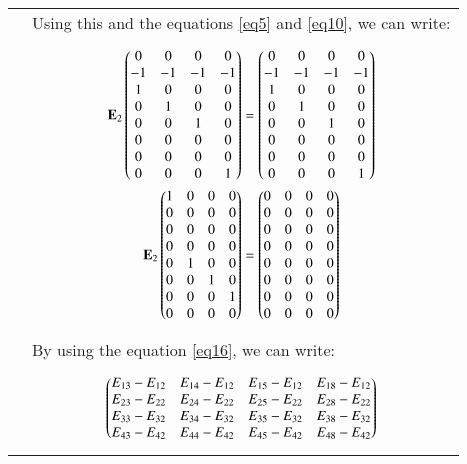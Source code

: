 \documentclass[journal,12pt]{IEEEtran}
\begin{document}
\begin{longtable}{|p{4cm}|p{14cm}|}
		&Using this and the equations \eqref{eq5} and \eqref{eq10}, we can write: \\
		&\begin{gather}
		\mathbf{E}_2 \begin{pmatrix}0 &0  &0  &0 \\ 
 -1&-1  &-1  &-1 \\ 
1 &0  &0  &0 \\ 
0 &1  &0  &0 \\ 
0 &0  &1  &0 \\ 
0 &0  &0  &0 \\ 
0 &0  &0  &0 \\ 
0 &0  &0  &1\end{pmatrix}=\begin{pmatrix}0 &0  &0  &0 \\ 
 -1&-1  &-1  &-1 \\ 
1 &0  &0  &0 \\ 
0 &1  &0  &0 \\ 
0 &0  &1  &0 \\ 
0 &0  &0  &0 \\ 
0 &0  &0  &0 \\ 
0 &0  &0  &1\end{pmatrix}\label{eq16}\\
		    \mathbf{E}_2 \begin{pmatrix}1 &0  &0  &0 \\ 
 0&0  &0  &0 \\ 
0 &0  &0  &0 \\ 
0 &0  &0  &0 \\ 
0 &1  &0  &0 \\ 
0 &0  &1  &0 \\ 
0 &0  &0  &1 \\ 
0 &0  &0  &0\end{pmatrix}=\begin{pmatrix}0 &0  &0  &0 \\ 
 0&0  &0  &0 \\ 
0 &0  &0  &0 \\ 
0 &0  &0  &0 \\ 
0 &0  &0  &0 \\ 
0 &0  &0  &0 \\ 
0 &0  &0  &0 \\ 
0 &0  &0  &0\end{pmatrix}\label{eq17}
		\end{gather}\\
		&By using the equation \eqref{eq16}, we can write:\\
		&\begin{gather}
		    \begin{pmatrix}E_{13} - E_{12}& E_{14} - E_{12}& E_{15} - E_{12}& E_{18} - E_{12}\\
E_{23} - E_{22}& E_{24} - E_{22}& E_{25} - E_{22}& E_{28} - E_{22}\\
E_{33} - E_{32}& E_{34} - E_{32}& E_{35} - E_{32}& E_{38} - E_{32}\\
E_{43} - E_{42}& E_{44} - E_{42}& E_{45} - E_{42}& E_{48} - E_{42}\\
\end{pmatrix}
\end{gather}
\end{longtable}
\end{document}
